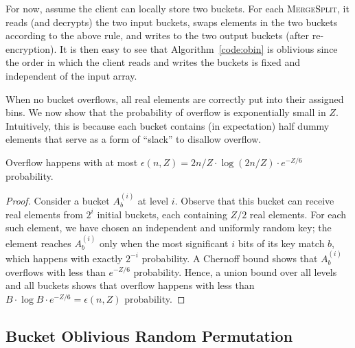 For now, assume the client can locally store two buckets.
For each \textsc{MergeSplit}, it reads (and decrypts) the two input buckets, swaps elements in the two buckets according to the above rule, and writes to the two output buckets (after re-encryption).
It is then easy to see that Algorithm~\ref{code:obin} is oblivious since the order in which the client reads and writes the buckets is fixed and independent of the input array.

When no bucket overflows, all real elements are correctly put into their assigned bins.
We now show that the probability of overflow is exponentially small in $Z$. 
Intuitively, this is because each bucket contains (in expectation) half dummy elements that serve as a form of ``slack'' to disallow overflow.

\begin{lemma}
\label{lemma:shuffle}
Overflow happens with at most $\epsilon(n, Z) = 2n/Z \cdot \log(2n/Z) \cdot e^{-Z/6}$ probability.
\end{lemma}
\begin{proof}
\label{clm:proof-shuffle}
Consider a bucket $A^{(i)}_b$ at level $i$.
Observe that this bucket can receive real elements from $2^i$ initial buckets, each containing $Z/2$ real elements.
For each such element, we have chosen an independent and uniformly random key;
the element reaches $A^{(i)}_b$ only when the most significant $i$ bits of its key match $b$,
which happens with exactly $2^{-i}$ probability.
A Chernoff bound shows that $A^{(i)}_b$ overflows with less than $e^{-Z/6}$ probability.
Hence, a union bound over all levels and all buckets 
shows that overflow happens with less than $B \cdot \log B \cdot e^{-Z/6} = \epsilon(n,Z)$ probability.
\end{proof}


\subsection{Bucket Oblivious Random Permutation}
\label{sec:ORP}


